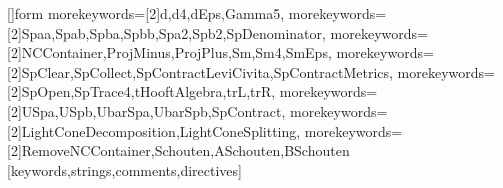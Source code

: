 []{form}{%
   morekeywords=[2]{d,d4,dEps,Gamma5},
   morekeywords=[2]{Spaa,Spab,Spba,Spbb,Spa2,Spb2,SpDenominator},
   morekeywords=[2]{NCContainer,ProjMinus,ProjPlus,Sm,Sm4,SmEps},
   morekeywords=[2]{SpClear,SpCollect,SpContractLeviCivita,SpContractMetrics},
   morekeywords=[2]{SpOpen,SpTrace4,tHooftAlgebra,trL,trR},
   morekeywords=[2]{USpa,USpb,UbarSpa,UbarSpb,SpContract},
   morekeywords=[2]{LightConeDecomposition,LightConeSplitting},
   morekeywords=[2]{RemoveNCContainer,Schouten,ASchouten,BSchouten}
}[keywords,strings,comments,directives]
